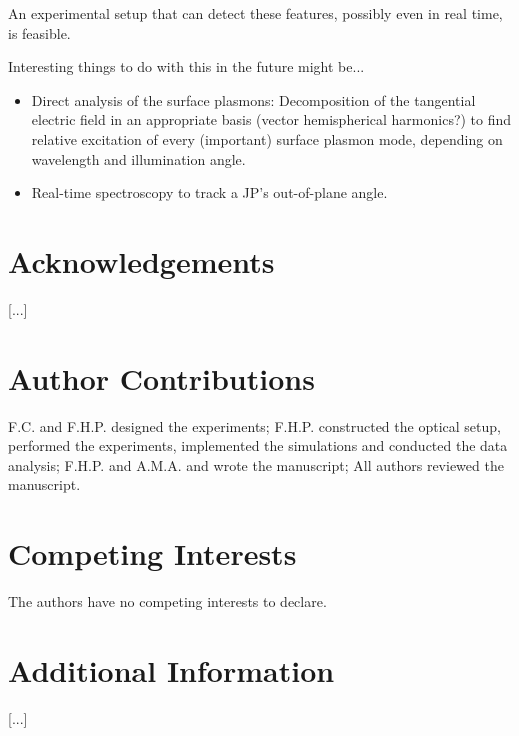 \documentclass[10pt]{article}
\begin{document}
\begin{multicols}{2}
An experimental setup that can detect these features, possibly even in real time, is feasible.

Interesting things to do with this in the future might be...
\begin{itemize}
    \item Direct analysis of the surface plasmons: 
    Decomposition of the tangential electric field in an appropriate basis (vector hemispherical harmonics?) to find relative excitation of every (important) surface plasmon mode, depending on wavelength and illumination angle.
    \item Real-time spectroscopy to track a JP's out-of-plane angle. 
\end{itemize}






\printbibliography

\section*{Acknowledgements}
[...]

\section*{Author Contributions}
F.C. and F.H.P. designed the experiments; 
F.H.P. constructed the optical setup, performed the experiments, implemented the simulations and conducted the data analysis; 
F.H.P. and A.M.A. and wrote the manuscript; 
All authors reviewed the manuscript.

\section*{Competing Interests}
The authors have no competing interests to declare. 

\section*{Additional Information}
[...]












\end{multicols}
\end{document}
